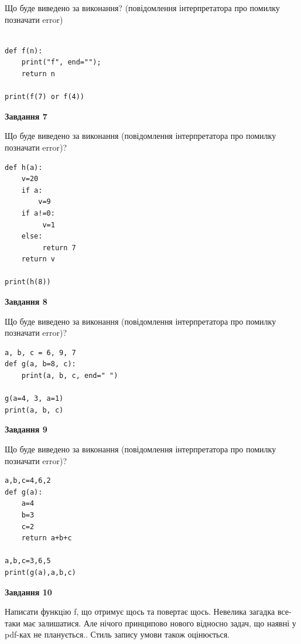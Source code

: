 \documentclass[12pt, ukrainian]{article}
\begin{document}
{\begin {large}
Що буде виведено за виконання? (повідомлення інтерпретатора про помилку позначати error)\par
\begin{verbatim}

def f(n):
    print("f", end="");
    return n

print(f(7) or f(4))
\end{verbatim}

{\begin {center}\textbf{Завдання 7}\end {center}}

Що буде виведено за виконання (повідомлення інтерпретатора про помилку позначати error)?\par
\begin{verbatim}
def h(a):
    v=20
    if a: 
        v=9
    if a!=0:
         v=1
    else:
         return 7
    return v

print(h(8))
\end{verbatim}

{\begin {center}\textbf{Завдання 8}\end {center}}

Що буде виведено за виконання (повідомлення інтерпретатора про помилку позначати error)?\par
\begin{verbatim}
a, b, c = 6, 9, 7
def g(a, b=8, c):
    print(a, b, c, end=" ")

g(a=4, 3, a=1)
print(a, b, c)
\end{verbatim}

{\begin {center}\textbf{Завдання 9}\end {center}}

Що буде виведено за виконання (повідомлення інтерпретатора про помилку позначати error)?\par
\begin{verbatim}
a,b,c=4,6,2
def g(a):
    a=4
    b=3
    c=2
    return a+b+c

a,b,c=3,6,5
print(g(a),a,b,c)
\end{verbatim}

{\begin {center}\textbf{Завдання 10}\end {center}}


Написати функцiю f, що отримує щось та повертає щось. Невелика загадка все-таки має залишатися. Але нічого принципово нового відносно задач, що наявні у pdf-ках не планується.. Стиль запису умови також оцінюється.\par
\end {large}}
\newpage
\end{document}
